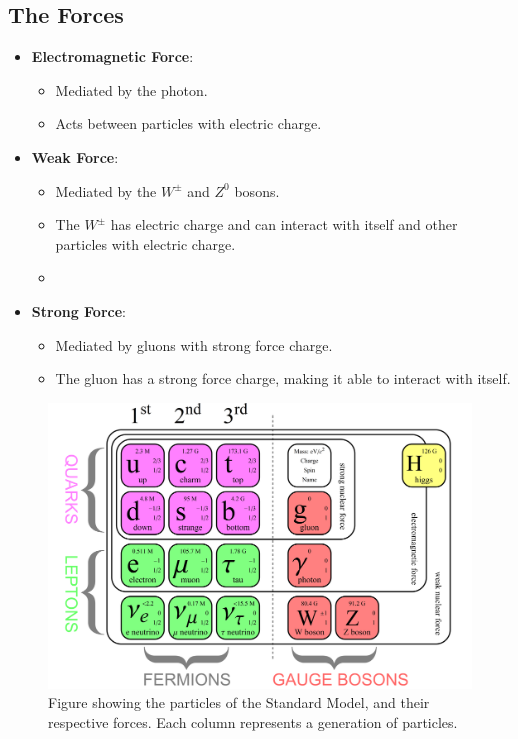 \documentclass{article}
\begin{document}
\subsection{The Forces}
\begin{itemize}
    \item \textbf{Electromagnetic Force}: 
    \begin{itemize}
        \item Mediated by the photon.
        \item Acts between particles with electric charge.
    \end{itemize} 
    \item \textbf{Weak Force}: 
    \begin{itemize}
        \item Mediated by the $W^{\pm}$ and $Z^0$ bosons.
        \item The $W^{±}$ has electric charge and can interact with itself and other particles with electric charge.
        \item 
    \end{itemize}
    \item \textbf{Strong Force}: 
    \begin{itemize}
        \item Mediated by gluons with strong force charge. 
        \item  The gluon has a strong force charge, making it able to interact with itself. 
    \end{itemize}
\end{itemize}

\begin{figure}[h!]
\centering
\includegraphics[width = .9\textwidth]{SM_particles.png}
\caption{Figure showing the particles of the Standard Model, and their respective forces. Each column represents a generation of particles.}
\label{fig: SM_particles}
\end{figure}
\end{document}
